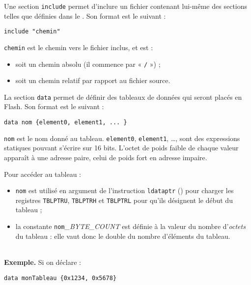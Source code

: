 
Une section \texttt{include} permet d'inclure un fichier contenant lui-même des sections telles que définies dans le .  Son format est le suivant :

\begin{lstlisting}[language=piccolo]
  include "chemin"
\end{lstlisting}

\texttt{chemin} est le chemin vers le fichier inclus, et est :
\begin{itemize}
  \item soit un chemin absolu (il commence par « \texttt{/} ») ;
  \item soit un chemin relatif par rapport au fichier source.
\end{itemize}









La section \texttt{data} permet de définir des tableaux de données qui seront placés en Flash. Son format est le suivant :

\begin{lstlisting}[language=piccolo]
  data nom {element0, element1, ... }
\end{lstlisting}

\texttt{nom} est le nom donné au tableau. \texttt{element0}, \texttt{element1}, …, sont des expressions statiques pouvant s'écrire sur 16 bits. L'octet de poids faible de chaque valeur apparaît à une adresse paire, celui de poids fort en adresse impaire.

Pour accéder au tableau :
\begin{itemize}
  \item \texttt{nom} est utilisé en argument de l'instruction \texttt{ldataptr} () pour charger les registres \texttt{TBLPTRU}, \texttt{TBLPTRH} et \texttt{TBLPTRL} pour qu'ils désignent le début du tableau ;
  \item la constante \texttt{nom}\emph{\small{\_BYTE\_COUNT}} est définie à la valeur du nombre d'\emph{octets} du tableau : elle vaut donc le double du nombre d'éléments du tableau.
\end{itemize}



~\\
\textbf{Exemple.} Si on déclare :
\begin{lstlisting}[language=piccolo]
  data monTableau {0x1234, 0x5678}
\end{lstlisting}

